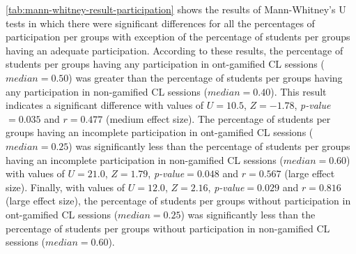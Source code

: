 \autoref{tab:mann-whitney-result-participation} shows the results of Mann-Whitney's U tests in which there were significant differences for all the percentages of participation per groups with exception of the percentage of students per groups having an adequate participation. According to these results, the percentage of students per groups having any participation in ont-gamified CL sessions ($median = 0.50$) was greater than the percentage of students per groups having any participation in non-gamified CL sessions ($median = 0.40$). This result indicates a significant difference with values of $U = 10.5$, $Z= -1.78$, \emph{p-value}$ = 0.035$ and $r = 0.477$ (medium effect size). The percentage of students per groups having an incomplete participation in ont-gamified CL sessions ($median = 0.25$) was significantly less than the percentage of students per groups having an incomplete participation in non-gamified CL sessions ($median = 0.60$) with values of $U = 21.0$, $Z= 1.79$, \emph{p-value}$ = 0.048$ and $r = 0.567$ (large effect size). Finally, with values of $U = 12.0$, $Z= 2.16$, \emph{p-value}$ = 0.029$ and $r = 0.816$ (large effect size), the percentage of students per groups without participation in ont-gamified CL sessions ($median = 0.25$) was significantly less than the percentage of students per groups without participation in non-gamified CL sessions ($median = 0.60$).

